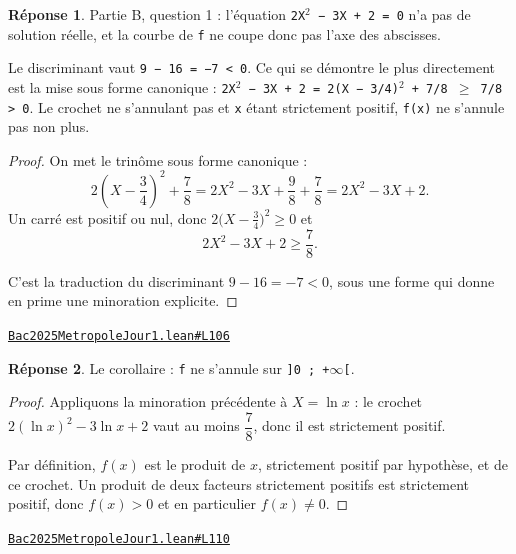 \documentclass[11pt,a4paper]{article}
\theoremstyle{definition}
\theoremstyle{plain}
\theoremstyle{definition}
\newtheorem*{reponse}{Réponse}
\newcommand{\source}[2]{\par\smallskip\noindent\hfill{\footnotesize\href{#1}{\texttt{#2}}}\par\smallskip}
\begin{document}
\begin{reponse}
Partie B, question 1 : l'équation \texttt{2X\(^{2}\) − 3X + 2 = 0} n'a pas de solution réelle,
et la courbe de \texttt{f} ne coupe donc pas l'axe des abscisses.

Le discriminant vaut \texttt{9 − 16 = −7 < 0}. Ce qui se démontre le plus directement est
la mise sous forme canonique : \texttt{2X\(^{2}\) − 3X + 2 = 2(X − 3/4)\(^{2}\) + 7/8 \(\ge\) 7/8 > 0}. Le
crochet ne s'annulant pas et \texttt{x} étant strictement positif, \texttt{f(x)} ne s'annule pas
non plus.
\end{reponse}
\begin{proof}
On met le trinôme sous forme canonique :
\[ 2\left(X - \frac{3}{4}\right)^2 + \frac{7}{8}
   = 2X^2 - 3X + \frac{9}{8} + \frac{7}{8} = 2X^2 - 3X + 2 . \]
Un carré est positif ou nul, donc $2\bigl(X - \tfrac{3}{4}\bigr)^2 \ge 0$ et
\[ 2X^2 - 3X + 2 \ge \frac{7}{8} . \]

C'est la traduction du discriminant $9 - 16 = -7 < 0$, sous une forme qui donne en prime
une minoration explicite.
\end{proof}
\source{https://github.com/Commutator-IO/learn-lean/blob/main/exams/2025/Bac2025MetropoleJour1.lean\#L106}{Bac2025MetropoleJour1.lean\#L106}

\begin{reponse}
Le corollaire : \texttt{f} ne s'annule sur \texttt{]0 ; +\(\infty\)[}.
\end{reponse}
\begin{proof}
Appliquons la minoration précédente à $X = \ln x$ : le crochet
$2(\ln x)^2 - 3\ln x + 2$ vaut au moins $\dfrac{7}{8}$, donc il est strictement positif.

Par définition, $f(x)$ est le produit de $x$, strictement positif par hypothèse, et de ce
crochet. Un produit de deux facteurs strictement positifs est strictement positif, donc
$f(x) > 0$ et en particulier $f(x) \ne 0$.
\end{proof}
\source{https://github.com/Commutator-IO/learn-lean/blob/main/exams/2025/Bac2025MetropoleJour1.lean\#L110}{Bac2025MetropoleJour1.lean\#L110}
\end{document}
